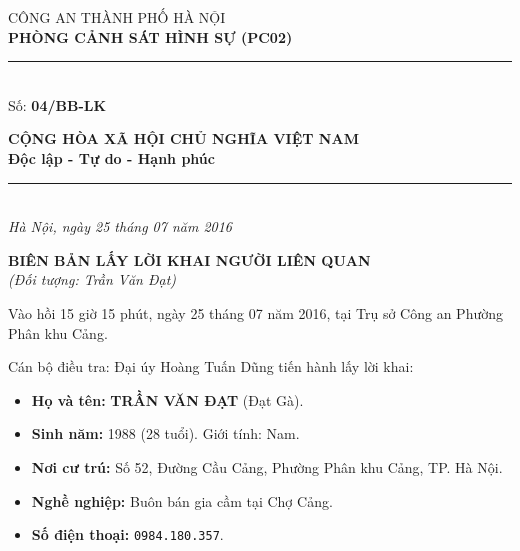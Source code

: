 \documentclass[12pt,a4paper]{article}
\begin{document}
\noindent
\begin{minipage}[t]{0.46\textwidth}
    \begin{center}
        \fontsize{11pt}{13pt}\selectfont
        CÔNG AN THÀNH PHỐ HÀ NỘI\\
        \textbf{PHÒNG CẢNH SÁT HÌNH SỰ (PC02)}\\[-0.2em]
        \rule{3.2cm}{0.6pt}\\[0.25cm]
        \fontsize{11pt}{13pt}\selectfont Số: \textbf{04/BB-LK}
    \end{center}
\end{minipage}
\hfill
\begin{minipage}[t]{0.52\textwidth}
    \begin{center}
        \fontsize{11pt}{13pt}\selectfont
        \textbf{CỘNG HÒA XÃ HỘI CHỦ NGHĨA VIỆT NAM}\\
        \textbf{Độc lập - Tự do - Hạnh phúc}\\[-0.2em]
        \rule{3.6cm}{0.6pt}\\[0.25cm]
        \textit{Hà Nội, ngày 25 tháng 07 năm 2016}
    \end{center}
\end{minipage}

\vspace{0.5cm}

\begin{center}
    \textbf{\Large BIÊN BẢN LẤY LỜI KHAI NGƯỜI LIÊN QUAN}\\[0.15cm]
    \textit{(Đối tượng: Trần Văn Đạt)}
\end{center}

\vspace{0.3cm}


Vào hồi 15 giờ 15 phút, ngày 25 tháng 07 năm 2016, tại Trụ sở Công an Phường Phân khu Cảng.

Cán bộ điều tra: Đại úy Hoàng Tuấn Dũng tiến hành lấy lời khai:


\begin{itemize}[leftmargin=*, itemsep=2pt, topsep=2pt, parsep=0pt]
  \item \textbf{Họ và tên:} \textbf{TRẦN VĂN ĐẠT} (Đạt Gà).
  \item \textbf{Sinh năm:} 1988 (28 tuổi). Giới tính: Nam.
  \item \textbf{Nơi cư trú:} Số 52, Đường Cầu Cảng, Phường Phân khu Cảng, TP. Hà Nội.
  \item \textbf{Nghề nghiệp:} Buôn bán gia cầm tại Chợ Cảng.
  \item \textbf{Số điện thoại:} \texttt{0984.180.357}.


\end{itemize}
\end{document}
